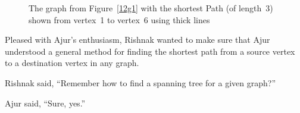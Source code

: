 \begin{figure}
\begin{center}
\caption{The graph from Figure~\ref{12g1} with the shortest Path (of length~3) shown from vertex~1 to vertex~6 using thick lines}\label{12g2}
\end{center}
\end{figure}

Pleased with Ajur's enthusiasm, Rishnak wanted to make sure that Ajur understood a general method for finding the shortest path from a source vertex to a destination vertex in any graph.

Rishnak said, ``Remember how to find a spanning tree for a given graph?''

Ajur said, ``Sure, yes.''

